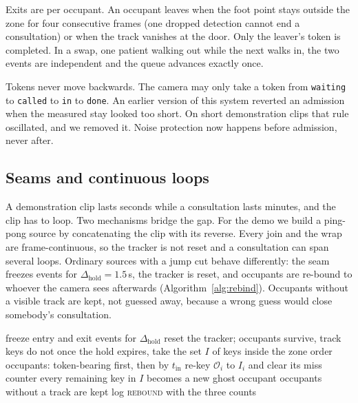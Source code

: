 \documentclass[conference]{IEEEtran}
\begin{document}
Exits are per occupant. An occupant leaves when the foot point stays outside
the zone for four consecutive frames (one dropped detection cannot end a
consultation) or when the track vanishes at the door. Only the leaver's token
is completed. In a swap, one patient walking out while the next walks in, the
two events are independent and the queue advances exactly once.

Tokens never move backwards. The camera may only take a token from
\texttt{waiting} to \texttt{called} to \texttt{in} to \texttt{done}. An earlier version
of this system reverted an admission when the measured stay looked too short.
On short demonstration clips that rule oscillated, and we removed it. Noise
protection now happens before admission, never after.

\subsection{Seams and continuous loops}
\label{sec:seam}
A demonstration clip lasts seconds while a consultation lasts minutes, and the
clip has to loop. Two mechanisms bridge the gap. For the demo we build a
ping-pong source by concatenating the clip with its reverse. Every join and the
wrap are frame-continuous, so the tracker is not reset and a consultation can
span several loops. Ordinary sources with a jump cut behave differently: the
seam freezes events for $\Delta_{\mathrm{hold}}=1.5$\,s, the tracker is reset,
and occupants are re-bound to whoever the camera sees afterwards
(Algorithm~\ref{alg:rebind}). Occupants without a visible track are kept, not
guessed away, because a wrong guess would close somebody's consultation.

\begin{algorithm}[t]
\caption{Seam re-binding of occupants}
\label{alg:rebind}
\begin{algorithmic}[1]
\State freeze entry and exit events for $\Delta_{\mathrm{hold}}$
\State reset the tracker; occupants survive, track keys do not
\State once the hold expires, take the set $I$ of keys inside the zone
\State order occupants: token-bearing first, then by $t_{\mathrm{in}}$
  \State re-key $\mathcal{O}_i$ to $I_i$ and clear its miss counter
\EndFor
\State every remaining key in $I$ becomes a new ghost occupant
\State occupants without a track are kept
\State log \textsc{rebound} with the three counts
\end{algorithmic}
\end{algorithm}
\end{document}
